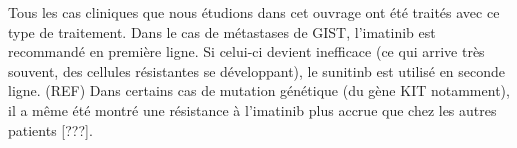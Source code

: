 \documentclass[main.tex]{subfiles}
\begin{document}
Tous les cas cliniques que nous étudions dans cet ouvrage ont été traités avec ce type de traitement. Dans le cas de métastases de GIST, l'imatinib est recommandé en première ligne. Si celui-ci devient inefficace (ce qui arrive très souvent, des cellules résistantes se développant), le sunitinb est utilisé en seconde ligne. (REF)
Dans certains cas de mutation génétique (du gène KIT notamment), il a même été montré une résistance à l'imatinib plus accrue que chez les autres patients [???].

%
%
\end{document}
